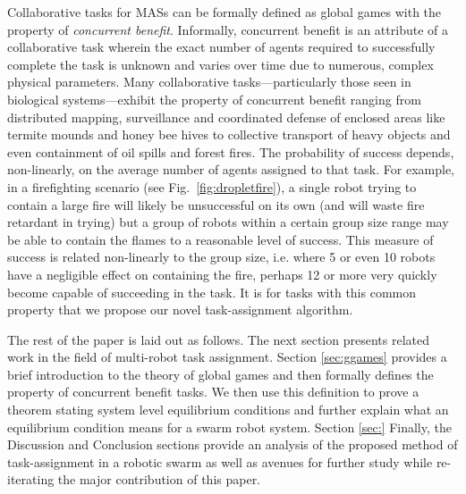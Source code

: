 \documentclass[conference]{ieeeconf}
\begin{document}
Collaborative tasks for MASs can be formally defined as global games with the property of \emph{concurrent benefit}. Informally, concurrent benefit is an attribute of a collaborative task wherein the exact number of agents required to successfully complete the task is unknown and varies over time due to numerous, complex physical parameters. Many collaborative tasks---particularly those seen in biological systems---exhibit the property of concurrent benefit ranging from distributed mapping, surveillance and coordinated defense of enclosed areas like termite mounds and honey bee hives \cite{Breed1990} to collective transport of heavy objects and even containment of oil spills and forest fires. The probability of success depends, non-linearly, on the average number of agents assigned to that task. For example, in a firefighting scenario (see Fig.~\ref{fig:dropletfire}), a single robot trying to contain a large fire will likely be unsuccessful on its own (and will waste fire retardant in trying) but a group of robots within a certain group size range may be able to contain the flames to a reasonable level of success. This measure of success is related non-linearly to the group size, i.e. where 5 or even 10 robots have a negligible effect on containing the fire, perhaps 12 or more very quickly become capable of succeeding in the task. It is for tasks with this common property that we propose our novel task-assignment algorithm.

The rest of the paper is laid out as follows. The next section presents related work in the field of multi-robot task assignment. Section \ref{sec:ggames} provides a brief introduction to the theory of global games and then formally defines the property of concurrent benefit tasks. We then use this definition to prove a theorem stating system level equilibrium conditions and further explain what an equilibrium condition means for a swarm robot system. Section \ref{sec:} Finally, the Discussion and Conclusion sections provide an analysis of the proposed method of task-assignment in a robotic swarm as well as avenues for further study while re-iterating the major contribution of this paper.
\end{document}
